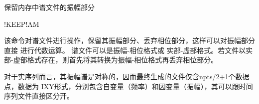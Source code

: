 \label{cmd:keepam}

保留内存中谱文件的振幅部分

\begin{SACSTX}
!KEEP!AM
\end{SACSTX}

该命令对谱文件进行操作，保留其振幅部分、丢弃相位部分，这样可以对振幅部分直接
进行代数运算。
谱文件可以是振幅-相位格式或
实部-虚部格式。若文件以实部-虚部格式存在，则首先将其转换为振幅-相位格式再丢弃相位部分。

对于实序列而言，其振幅谱是对称的，因而最终生成的文件仅含npts/2+1个数据点，数据为
IXY形式，分别包含自变量（频率）和因变量（振幅），其可以跟时间序列文件直接区分开。
